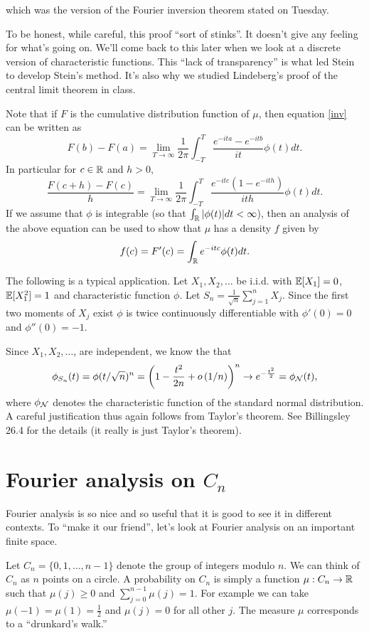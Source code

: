 which was the version of the Fourier inversion theorem stated on Tuesday.
\begin{remark}
    To be honest, while careful, this proof ``sort of stinks''. It doesn't give any feeling for what's going on. We'll come back to this later when we look at a discrete version of characteristic functions. This ``lack of transparency'' is what led Stein to develop Stein's method. It's also why we studied Lindeberg's proof of the central limit theorem in class.
\end{remark}
\begin{remark}
    Note that if $F$ is the cumulative distribution function of $\mu$, then equation \eqref{inv} can be written as 
    \[F(b)-F(a) = \lim_{T \to \infty} \frac{1}{2\pi}\int_{-T}^T \frac{e^{-ita}-e^{-itb}}{it}\phi(t)dt. \]
    In particular for $c \in {\mathbb R}$ and $h>0$,
    \[\frac{F(c+h)-F(c)}{h} =\lim_{T \to \infty} \frac{1}{2\pi}\int_{-T}^T \frac{e^{-itc}(1-e^{-ith})}{ith}\phi(t)dt. \]
    If we assume that $\phi$ is integrable (so that $\int_{\mathbb R} {\left\lvert\phi(t)\right\rvert}dt < \infty$), then an analysis of the above equation can be used to show that $\mu$ has a density $f$ given by
    \[f(c) = F'(c) = \int_{\mathbb R} e^{-itc}\phi(t)dt. \]
\end{remark}
\begin{ex}
    The following is a typical application. Let $X_1,X_2,\ldots$ be i.i.d. with ${\mathbb{E}}[X_1]=0$, ${\mathbb{E}}[X_1^2]=1$ and characteristic function $\phi$. Let $S_n = \frac{1}{\sqrt{n}}\sum_{j=1}^n X_j$. Since the first two moments of $X_j$ exist $\phi$ is twice continuously differentiable with $\phi'(0)=0$ and $\phi''(0)=-1$. 

    Since $X_1,X_2,\ldots$, are independent, we know the that
    \[\phi_{S_n}(t)=\phi(t/\sqrt{n})^n = \left(1-\frac{t^2}{2n}+o\left(1/n\right)\right)^n \to e^{-\frac{t^2}{2}} =\phi_{{{\mathcal{N}}}}(t), \]
    where $\phi_{{\mathcal{N}}}$ denotes the characteristic function of the standard normal distribution. A careful justification thus again follows from Taylor's theorem. See Billingsley 26.4 for the details (it really is just Taylor's theorem).
\end{ex}
\section{Fourier analysis on $C_n$}
Fourier analysis is so nice and so useful that it is good to see it in different contexts. To ``make it our friend'', let's look at Fourier analysis on an important finite space.

Let $C_n = \{0,1,\ldots,n-1\}$ denote the group of integers modulo $n$. We can think of $C_n$ as $n$ points on a circle. A probability on $C_n$ is simply a function $\mu:C_n \to {\mathbb R}$ such that $\mu(j) \ge 0$ and $\sum_{j=0}^{n-1} \mu(j)=1$. For example we can take $\mu(-1)=\mu(1)=\frac{1}{2}$ and $\mu(j)=0$ for all other $j$. The measure $\mu$ corresponds to a ``drunkard's walk.''

